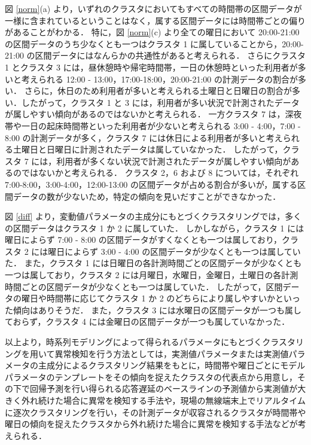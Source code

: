 \documentclass[technicalreport]{ieicej}
\begin{document}
図 \ref{norm}(a) より，いずれのクラスタにおいてもすべての時間帯の区間データが一様に含まれているということはなく，属する区間データには時間帯ごとの偏りがあることがわかる．
特に，図 \ref{norm}(c) より全ての曜日において 20:00-21:00 の区間データのうち少なくとも一つはクラスタ 1 に属していることから，20:00-21:00 の区間データにはなんらかの共通性があると考えられる．
さらにクラスタ 1 とクラスタ 3 には，昼休憩時や帰宅時間帯，一日の休憩時といった利用者が多いと考えられる 12:00 - 13:00，17:00-18:00，20:00-21:00 の計測データの割合が多い．
さらに，休日のため利用者が多いと考えられる土曜日と日曜日の割合が多い．したがって，クラスタ 1 と 3 には，利用者が多い状況で計測されたデータが属しやすい傾向があるのではないかと考えられる．
一方クラスタ 7 は，深夜帯や一日の起床時間帯といった利用者が少ないと考えられる 3:00 - 4:00，7:00 - 8:00 の計測データが多く，クラスタ 7 には休日による利用者が多いと考えられる土曜日と日曜日に計測されたデータは属していなかった．
したがって，クラスタ 7 には，利用者が多くない状況で計測されたデータが属しやすい傾向があるのではないかと考えられる．
クラスタ 2，6 および 8 については，それぞれ 7:00-8:00，3:00-4:00，12:00-13:00 の区間データが占める割合が多いが，属する区間データの数が少ないため，特定の傾向を見いだすことができなかった．

図 \ref{diff} より，変動値パラメータの主成分にもとづくクラスタリングでは，多くの区間データはクラスタ 1 か 2 に属していた．
しかしながら，クラスタ 1 には曜日によらず 7:00 - 8:00 の区間データがすくなくとも一つは属しており，クラスタ 2 には曜日によらず 3:00 - 4:00 の区間データが少なくとも一つは属していた．
また，クラスタ 1 には日曜日の各計測時間ごとの区間データが少なくとも一つは属しており，クラスタ 2 には月曜日，水曜日，金曜日，土曜日の各計測時間ごとの区間データが少なくとも一つは属していた．
したがって，区間データの曜日や時間帯に応じてクラスタ 1 か 2 のどちらにより属しやすいかといった傾向はありそうだ．
また，クラスタ 3 には水曜日の区間データが一つも属しておらず，クラスタ 4 には金曜日の区間データが一つも属していなかった．

以上より，時系列モデリングによって得られるパラメータにもとづくクラスタリングを用いて異常検知を行う方法としては，実測値パラメータまたは実測値パラメータの主成分によるクラスタリング結果をもとに，時間帯や曜日ごとにモデルパラメータのテンプレートをその傾向を捉えたクラスタの代表点から用意し，その下で回帰予測を行い得られる応答遅延のベースラインの予測値から実測値が大きく外れ続けた場合に異常を検知する手法や，現場の無線端末上でリアルタイムに逐次クラスタリングを行い，その計測データが収容されるクラスタが時間帯や曜日の傾向を捉えたクラスタから外れ続けた場合に異常を検知する手法などが考えられる．
\end{document}
